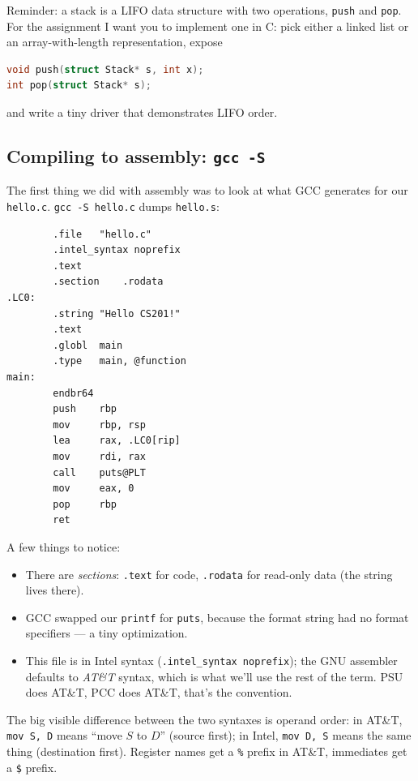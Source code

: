 \documentclass[11pt]{article}
\begin{document}
Reminder: a stack is a LIFO data structure with two operations,
\texttt{push} and \texttt{pop}. For the assignment I want you to
implement one in C: pick either a linked list or an array-with-length
representation, expose
\begin{lstlisting}[language=C]
void push(struct Stack* s, int x);
int pop(struct Stack* s);
\end{lstlisting}
and write a tiny driver that demonstrates LIFO order.

\subsection*{Compiling to assembly: \texttt{gcc -S}}

The first thing we did with assembly was to look at what GCC
generates for our \texttt{hello.c}. \texttt{gcc -S hello.c} dumps
\texttt{hello.s}:

\begin{lstlisting}
        .file	"hello.c"
        .intel_syntax noprefix
        .text
        .section	.rodata
.LC0:
        .string	"Hello CS201!"
        .text
        .globl	main
        .type	main, @function
main:
        endbr64
        push    rbp
        mov     rbp, rsp
        lea     rax, .LC0[rip]
        mov     rdi, rax
        call    puts@PLT
        mov     eax, 0
        pop     rbp
        ret
\end{lstlisting}

A few things to notice:
\begin{itemize}
  \item There are \emph{sections}: \texttt{.text} for code,
    \texttt{.rodata} for read-only data (the string lives there).
  \item GCC swapped our \texttt{printf} for \texttt{puts}, because
    the format string had no format specifiers --- a tiny optimization.
  \item This file is in Intel syntax (\texttt{.intel\_syntax
    noprefix}); the GNU assembler defaults to \emph{AT\&T} syntax,
    which is what we'll use the rest of the term. PSU does AT\&T,
    PCC does AT\&T, that's the convention.
\end{itemize}

The big visible difference between the two syntaxes is operand order:
in AT\&T, \texttt{mov S, D} means ``move $S$ to $D$'' (source first);
in Intel, \texttt{mov D, S} means the same thing (destination first).
Register names get a \texttt{\%} prefix in AT\&T, immediates get a
\texttt{\$} prefix.
\end{document}
